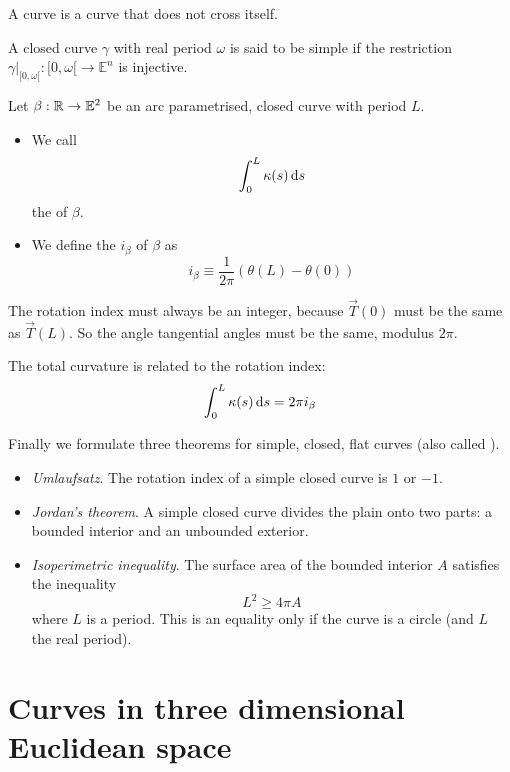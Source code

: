 \begin{definition}
A  curve is a curve that does not cross itself. 
\end{definition}
A closed curve $\gamma$ with real period $\omega$ is said to be simple if the restriction $\gamma|_{[0,\omega[}: [0,\omega[ \to \mathbb{E}^n $ is injective.

\begin{definition}
Let $\beta:\mathbb{R} \to \mathbb{E}^2$ be an arc parametrised, closed curve with period $L$.
\begin{itemize}
\item We call
\[ \int_0^L \kappa(s) \operatorname{d \!}{s} \]
the  of $\beta$.
\item We define the  $i_\beta$ of $\beta$ as
\[ i_\beta \equiv \frac{1}{2\pi}\left(\theta(L) - \theta(0)\right) \]
\end{itemize}
\end{definition}
The rotation index must always be an integer, because $\vec{T}(0)$ must be the same as $\vec{T}(L)$. So the angle tangential angles must be the same, modulus $2\pi$.

\begin{eigenschap}
The total curvature is related to the rotation index:
\[ \int_0^L\kappa(s)\operatorname{d \!}{s} = 2\pi i_\beta \]
\end{eigenschap}

Finally we formulate three theorems for simple, closed, flat curves (also called ).
\begin{eigenschap}
\begin{itemize}
\item \textit{Umlaufsatz}. The rotation index of a simple closed curve is $1$ or $-1$.
\item \textit{Jordan's theorem}. A simple closed curve divides the plain onto two parts: a bounded interior and an unbounded exterior.
\item \textit{Isoperimetric inequality}. The surface area of the bounded interior $A$ satisfies the inequality
\[ L^2 \geq 4\pi A \]
where $L$ is a period. This is an equality only if the curve is a circle (and $L$ the real period).
\end{itemize}
\end{eigenschap}

\section{Curves in three dimensional Euclidean space}
